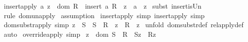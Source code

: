 \begin{isabellebody}
\ insert{\isacharunderscore}apply{}{\isacharcolon}\ {\isachardoublequoteopen}{\isacharbang}{\isacharbang}a{\isachardot}\ z\ {\isachartilde}{\isacharcolon}\ dom\ R\ {\isacharequal}{\isacharequal}{\isachargreater}\ {\isacharparenleft}insert\ a\ R{\isacharparenright}\ {\isacharpercent}{\isacharcircum}\ z\ {\isacharequal}\ {\isacharbraceleft}a{\isacharbraceright}\ {\isacharpercent}{\isacharcircum}\ z{\isachardoublequoteclose}\isanewline
%
\isadelimproof
%
\endisadelimproof
%
\isatagproof
{}\isamarkupfalse%
\ {\isacharparenleft}subst\ insert{\isacharunderscore}is{\isacharunderscore}Un{\isacharparenright}\isanewline
\isanewline
{}\isamarkupfalse%
\ {\isacharparenleft}rule\ dom{\isacharunderscore}un{\isacharunderscore}apply{\isacharparenright}\isanewline
{}\isamarkupfalse%
\ assumption\isanewline
{}\isamarkupfalse%
%
\endisatagproof
{\isafoldproof}%
%
\isadelimproof
\isanewline
%
\endisadelimproof
\isanewline
{}\isamarkupfalse%
\ insert{\isacharunderscore}apply\ {\isacharbrackleft}simp{\isacharbrackright}\ insert{\isacharunderscore}apply{}\ {\isacharbrackleft}simp{\isacharbrackright}\isanewline
\isanewline
\isanewline
\isanewline
{}\isamarkupfalse%
\ dom{\isacharunderscore}substr{\isacharunderscore}apply\ {\isacharbrackleft}simp{\isacharbrackright}{\isacharcolon}\ {\isachardoublequoteopen}z\ {\isachartilde}{\isacharcolon}\ S\ {\isacharequal}{\isacharequal}{\isachargreater}\ {\isacharparenleft}S\ {\isacharless}{\isacharminus}{\isacharcolon}\ R{\isacharparenright}\ {\isacharpercent}{\isacharcircum}\ z\ {\isacharequal}\ R\ {\isacharpercent}{\isacharcircum}\ z{\isachardoublequoteclose}\isanewline
%
\isadelimproof
%
\endisadelimproof
%
\isatagproof
{}\isamarkupfalse%
\ {\isacharparenleft}unfold\ dom{\isacharunderscore}substr{\isacharunderscore}def\ rel{\isacharunderscore}apply{\isacharunderscore}def{\isacharparenright}\isanewline
{}\isamarkupfalse%
\ auto\isanewline
{}\isamarkupfalse%
%
\endisatagproof
{\isafoldproof}%
%
\isadelimproof
\isanewline
%
\endisadelimproof
\isanewline
\isanewline
{}\isamarkupfalse%
\ override{\isacharunderscore}apply{}\ {\isacharbrackleft}simp{\isacharbrackright}{\isacharcolon}\ \isanewline
{\isachardoublequoteopen}{\isacharparenleft}z\ {\isachartilde}{\isacharcolon}\ {\isacharparenleft}dom\ S{\isacharparenright}{\isacharparenright}\ {\isacharequal}{\isacharequal}{\isachargreater}\ {\isacharparenleft}{\isacharparenleft}{\isacharparenleft}R\ {\isacharparenleft}{\isacharplus}{\isacharparenright}\ S{\isacharparenright}{\isacharpercent}{\isacharcircum}z{\isacharparenright}\ {\isacharequal}\ {\isacharparenleft}R{\isacharpercent}{\isacharcircum}z{\isacharparenright}{\isacharparenright}{\isachardoublequoteclose}\isanewline

\end{isabellebody}

